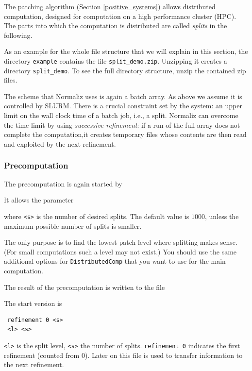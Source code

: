 The patching algorithm (Section \ref{positive_systems}) allows distributed computation, designed for computation on a high performance cluster (HPC). The parts into which the computation is distributed are called \emph{splits} in the following.

As an example for the whole file structure that we will explain in this section, the directory \verb*|example| contains the file \verb*|split_demo.zip|. Unzipping it creates a directory \verb*|split_demo|. To see the full directory structure, unzip the contained zip files.

The scheme that Normaliz uses is again a batch array. As above we assume it is controlled by SLURM. There is a crucial  constraint set by the system: an upper limit on the wall clock time of a batch job, i.e., a split. Normaliz can overcome the time limit by using \emph{successive refinement}: if a run of the full array does not complete the computation,it creates temporary files whose contents are then read and exploited by the next refinement.

\subsubsection{Precomputation}

The precomputation is again started by
\begin{itemize}
\end{itemize}
It allows the parameter
\begin{itemize}
\end{itemize}
where \verb*|<s>| is the number of desired splits. The default value is $1000$, unless the maximum possible number of splits is smaller. 

 The only purpose is to find the lowest patch level where splitting makes sense. (For small computations such a level may not exist.) You should use the same additional options for \verb*|DistributedComp| that you want to use for the main computation.
 
 The result of the precomputation is written to the file
 \begin{itemize}
 \end{itemize}
The start version is
 \begin{Verbatim}
 refinement 0 <s>
 <l> <s>
 \end{Verbatim}
 \verb*|<l>| is the split level, \verb*|<s>| the number of splits. \verb*|refinement 0| indicates the first refinement (counted from $0$). Later on this file is used to transfer information to the next refinement.

